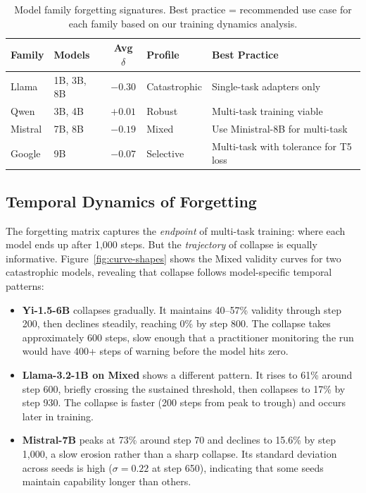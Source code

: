 \documentclass[11pt]{article}
\begin{document}
\begin{table}[t]
\centering
\caption{Model family forgetting signatures.  Best practice = recommended use case for each family based on our training dynamics analysis.}
\label{tab:family-summary}
\small
\begin{tabular}{l l c l l}
\toprule
\textbf{Family} & \textbf{Models} & \textbf{Avg $\delta$} & \textbf{Profile} & \textbf{Best Practice} \\
\midrule
Llama   & 1B, 3B, 8B & $-0.30$ & Catastrophic & Single-task adapters only \\
Qwen    & 3B, 4B     & $+0.01$ & Robust       & Multi-task training viable \\
Mistral & 7B, 8B     & $-0.19$ & Mixed        & Use Ministral-8B for multi-task \\
Google  & 9B         & $-0.07$ & Selective    & Multi-task with tolerance for T5 loss \\
\bottomrule
\end{tabular}
\end{table}

\subsection{Temporal Dynamics of Forgetting}

The forgetting matrix captures the \emph{endpoint} of multi-task training: where each model ends up after 1{,}000 steps.  But the \emph{trajectory} of collapse is equally informative.  Figure~\ref{fig:curve-shapes} shows the Mixed validity curves for two catastrophic models, revealing that collapse follows model-specific temporal patterns:

\begin{itemize}[leftmargin=*]
\item \textbf{Yi-1.5-6B} collapses gradually.  It maintains 40--57\% validity through step 200, then declines steadily, reaching 0\% by step 800.  The collapse takes approximately 600 steps, slow enough that a practitioner monitoring the run would have 400+ steps of warning before the model hits zero.

\item \textbf{Llama-3.2-1B on Mixed} shows a different pattern.  It rises to 61\% around step 600, briefly crossing the sustained threshold, then collapses to 17\% by step 930.  The collapse is faster (200 steps from peak to trough) and occurs later in training.

\item \textbf{Mistral-7B} peaks at 73\% around step 70 and declines to 15.6\% by step 1{,}000, a slow erosion rather than a sharp collapse.  Its standard deviation across seeds is high ($\sigma = 0.22$ at step 650), indicating that some seeds maintain capability longer than others.
\end{itemize}
\end{document}
